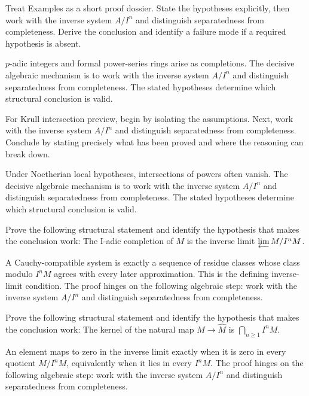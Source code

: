 \begin{problem}\label{prob:v18-problem-07}
Treat Examples as a short proof dossier. State the hypotheses explicitly, then work with the inverse system \(A/I^n\) and distinguish separatedness from completeness. Derive the conclusion and identify a failure mode if a required hypothesis is absent.
\end{problem}
\begin{solution}
$p$-adic integers and formal power-series rings arise as completions. The decisive algebraic mechanism is to work with the inverse system \(A/I^n\) and distinguish separatedness from completeness. The stated hypotheses determine which structural conclusion is valid.
\end{solution}

\begin{problem}\label{prob:v18-problem-08}
For Krull intersection preview, begin by isolating the assumptions. Next, work with the inverse system \(A/I^n\) and distinguish separatedness from completeness. Conclude by stating precisely what has been proved and where the reasoning can break down.
\end{problem}
\begin{solution}
Under Noetherian local hypotheses, intersections of powers often vanish. The decisive algebraic mechanism is to work with the inverse system \(A/I^n\) and distinguish separatedness from completeness. The stated hypotheses determine which structural conclusion is valid.
\end{solution}

\begin{problem}\label{prob:v18-problem-09}
Prove the following structural statement and identify the hypothesis that makes the conclusion work: The I-adic completion of $M$ is the inverse limit $\varprojlim M/I^nM$.
\end{problem}
\begin{solution}
A Cauchy-compatible system is exactly a sequence of residue classes whose class modulo $I^nM$ agrees with every later approximation. This is the defining inverse-limit condition. The proof hinges on the following algebraic step: work with the inverse system \(A/I^n\) and distinguish separatedness from completeness.
\end{solution}

\begin{problem}\label{prob:v18-problem-10}
Prove the following structural statement and identify the hypothesis that makes the conclusion work: The kernel of the natural map $M\to\widehat M$ is $\bigcap_{n\ge1}I^nM$.
\end{problem}
\begin{solution}
An element maps to zero in the inverse limit exactly when it is zero in every quotient $M/I^nM$, equivalently when it lies in every $I^nM$. The proof hinges on the following algebraic step: work with the inverse system \(A/I^n\) and distinguish separatedness from completeness.
\end{solution}

